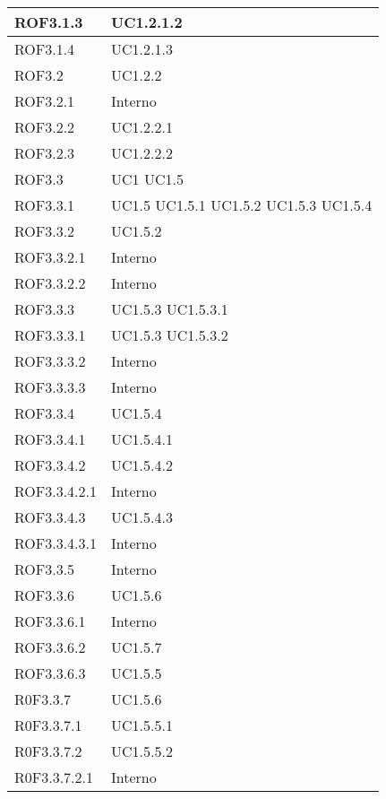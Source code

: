 \begin{center}
\begin{longtable}{| p{4cm} | p{4cm} |}
\hline
ROF3.1.3   &  UC1.2.1.2 \\
\hline
ROF3.1.4   &  UC1.2.1.3 \\
\hline
ROF3.2   &  UC1.2.2 \\
\hline
ROF3.2.1   &  Interno \\
\hline
ROF3.2.2   &  UC1.2.2.1 \\
\hline
ROF3.2.3   &  UC1.2.2.2 \\
\hline
ROF3.3   &  UC1 \newline UC1.5 \\
\hline
ROF3.3.1   &  UC1.5 \newline UC1.5.1 \newline UC1.5.2 \newline UC1.5.3 \newline UC1.5.4 \\
\hline
ROF3.3.2   &  UC1.5.2 \\
\hline
ROF3.3.2.1   &  Interno \\
\hline
ROF3.3.2.2   &  Interno \\
\hline
ROF3.3.3   &  UC1.5.3 \newline UC1.5.3.1  \\
\hline
ROF3.3.3.1   &  UC1.5.3 \newline UC1.5.3.2  \\
\hline
ROF3.3.3.2   &  Interno \\
\hline
ROF3.3.3.3   &  Interno \\
\hline
ROF3.3.4   &  UC1.5.4 \\
\hline
ROF3.3.4.1   &  UC1.5.4.1 \\
\hline
ROF3.3.4.2   &  UC1.5.4.2 \\
\hline
ROF3.3.4.2.1   &  Interno \\
\hline
ROF3.3.4.3   &  UC1.5.4.3 \\
\hline
ROF3.3.4.3.1   &  Interno \\
\hline
ROF3.3.5   &  Interno \\
\hline
ROF3.3.6   &  UC1.5.6 \\
\hline
ROF3.3.6.1   &  Interno \\
\hline
ROF3.3.6.2   &  UC1.5.7 \\
\hline
ROF3.3.6.3   &  UC1.5.5 \\
\hline
R0F3.3.7   &  UC1.5.6 \\
\hline
R0F3.3.7.1   &  UC1.5.5.1 \\
\hline
R0F3.3.7.2   &  UC1.5.5.2 \\
\hline
R0F3.3.7.2.1   &  Interno \\

\end{longtable}
\end{center}
